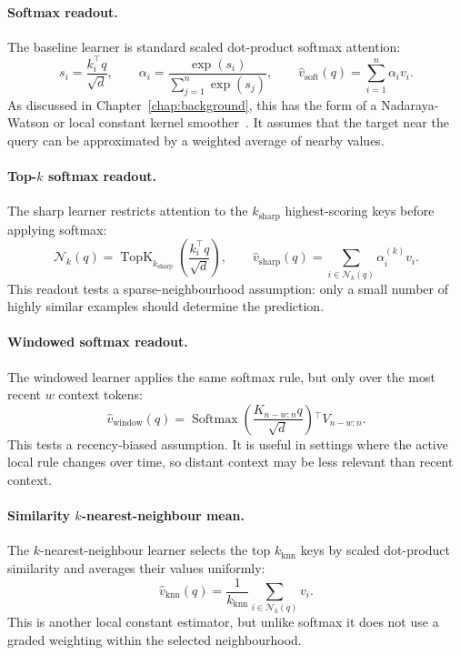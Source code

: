 \paragraph{Softmax readout.}
The baseline learner is standard scaled dot-product softmax attention:
\[
s_i = \frac{k_i^\top q}{\sqrt{d}},
\qquad
\alpha_i = \frac{\exp(s_i)}{\sum_{j=1}^{n}\exp(s_j)},
\qquad
\hat v_{\mathrm{soft}}(q) = \sum_{i=1}^{n}\alpha_i v_i .
\]
As discussed in Chapter~\ref{chap:background}, this has the form of a Nadaraya-Watson or local constant kernel smoother~\cite{tsai2019transformer,wang2025test}. It assumes that the target near the query can be approximated by a weighted average of nearby values.

\paragraph{Top-\(k\) softmax readout.}
The sharp learner restricts attention to the \(k_{\mathrm{sharp}}\) highest-scoring keys before applying softmax:
\[
\mathcal{N}_k(q) = \operatorname{TopK}_{k_{\mathrm{sharp}}}
\left(\frac{k_i^\top q}{\sqrt{d}}\right),
\qquad
\hat v_{\mathrm{sharp}}(q)
=
\sum_{i \in \mathcal{N}_k(q)}
\alpha_i^{(k)} v_i .
\]
This readout tests a sparse-neighbourhood assumption: only a small number of highly similar examples should determine the prediction.

\paragraph{Windowed softmax readout.}
The windowed learner applies the same softmax rule, but only over the most recent \(w\) context tokens:
\[
\hat v_{\mathrm{window}}(q)
=
\operatorname{Softmax}\left(\frac{K_{n-w:n}q}{\sqrt{d}}\right){}^\top V_{n-w:n}.
\]
This tests a recency-biased assumption. It is useful in settings where the active local rule changes over time, so distant context may be less relevant than recent context.

\paragraph{Similarity \(k\)-nearest-neighbour mean.}
The \(k\)-nearest-neighbour learner selects the top \(k_{\mathrm{knn}}\) keys by scaled dot-product similarity and averages their values uniformly:
\[
\hat v_{\mathrm{knn}}(q)
=
\frac{1}{k_{\mathrm{knn}}}
\sum_{i \in \mathcal{N}_k(q)} v_i .
\]
This is another local constant estimator, but unlike softmax it does not use a graded weighting within the selected neighbourhood.

